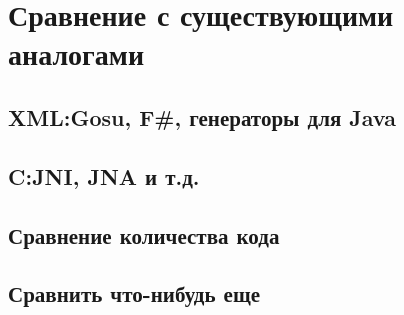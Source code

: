 \section{Сравнение с существующими аналогами}
\subsection{XML:\@ Gosu, F\#, генераторы для Java}
\subsection{C:\@ JNI, JNA и т.д.}
\subsection{Сравнение количества кода}
\subsection{Сравнить что-нибудь еще}